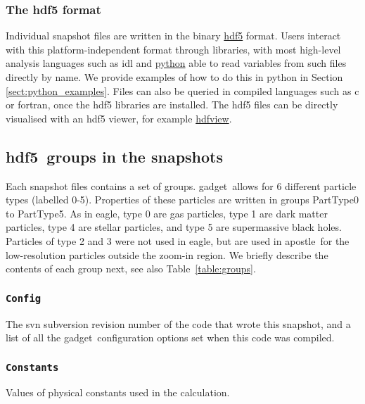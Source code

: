 \documentclass[10pt, a4paper]{article}
\newcommand{\eagle}{{\sc eagle}}
\newcommand{\apostle}{{\sc apostle}}
\newcommand{\hdf}{{\sc hdf5}}
\newcommand{\gadget}{{\sc gadget}}
\begin{document}
\subsubsection{The {\sc hdf5} format}
Individual snapshot files are written in the binary
{\color{blue}\href{https://www.hdfgroup.org/HDF5/}{\sc hdf5} format}. Users
interact with this platform-independent format through libraries, with most
high-level analysis languages such as {\sc idl} and
{\color{blue}\href{https://www.python.org/}{\sc python}} able to read variables
from such files directly by name. We provide examples of how to do this in {\sc
python} in Section \ref{sect:python_examples}.  Files can also be queried in
compiled languages such as {\sc c} or {\sc fortran}, once the {\sc hdf5}
libraries are installed. The {\sc hdf5} files can be directly visualised with
an {\sc hdf5} viewer, for example
{\color{blue}\href{https://www.hdfgroup.org/hdf-java-html/hdfview/}{hdfview}}.

\subsection{\hdf\ groups in the snapshots}
\label{sect:fof}
Each snapshot files contains a set of groups. \gadget\ allows for 6 different
particle types (labelled 0-5). Properties of these particles are written in
groups PartType0 to PartType5. As in \eagle, type 0 are gas particles, type 1 are
dark matter particles, type 4 are stellar particles, and type 5 are
supermassive black holes. Particles of type 2 and 3 were not used in \eagle, but are
used in \apostle\ for the low-resolution particles outside the zoom-in region. We briefly describe the
contents of each group next, see also Table~\ref{table:groups}.

\subsubsection{\texttt{Config}}
The svn subversion revision number of the code that wrote this snapshot, and a
list of all the \gadget\ configuration options set when this code was compiled.

\subsubsection{\texttt{Constants}} Values of physical constants used in the
calculation.
\end{document}
